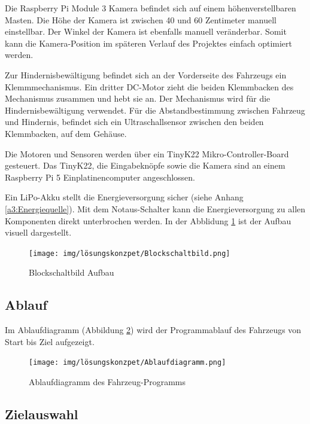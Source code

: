 \documentclass[../main.tex]{subfiles}
\begin{document}
Die Raspberry Pi Module 3 Kamera befindet sich auf einem höhenverstellbaren Masten. Die Höhe der Kamera ist zwischen 40 und 60 Zentimeter manuell einstellbar. Der Winkel der Kamera ist ebenfalls manuell veränderbar. Somit kann die Kamera-Position im späteren Verlauf des Projektes einfach optimiert werden.

Zur Hindernisbewältigung befindet sich an der Vorderseite des Fahrzeugs ein Klemmmechanismus. Ein dritter DC-Motor zieht die beiden Klemmbacken des Mechanismus zusammen und hebt sie an. Der Mechanismus wird für die Hindernisbewältigung verwendet. Für die Abstandbestimmung zwischen Fahrzeug und Hindernis, befindet sich ein Ultraschallsensor zwischen den beiden Klemmbacken, auf dem Gehäuse. 

Die Motoren und Sensoren werden über ein TinyK22 Mikro-Controller-Board gesteuert. Das TinyK22, die Eingabeknöpfe sowie die Kamera sind an einem Raspberry Pi 5 Einplatinencomputer angeschlossen.

Ein LiPo-Akku stellt die Energieversorgung sicher (siehe Anhang \ref{a3:Energiequelle}).
Mit dem Notaus-Schalter kann die Energieversorgung zu allen Komponenten direkt unterbrochen werden.
In der Abblidung \ref{img:Blockschaltbild-Aufbau} ist der Aufbau visuell dargestellt.
\newline
\begin{figure}[H]
\centering
\texttt{[image: img/lösungskonzpet/Blockschaltbild.png]}
\caption{Blockschaltbild Aufbau}
\label{img:Blockschaltbild-Aufbau}
\end{figure}

\subsection{Ablauf}

Im Ablaufdiagramm (Abbildung \ref{img:ablaufdiagramm}) wird der Programmablauf des Fahrzeugs von Start bis Ziel aufgezeigt.

\begin{figure}[H]
\texttt{[image: img/lösungskonzpet/Ablaufdiagramm.png]}
\caption{Ablaufdiagramm des Fahrzeug-Programms}
\label{img:ablaufdiagramm}
\end{figure}

\newpage
\subsection{Zielauswahl}
\end{document}
